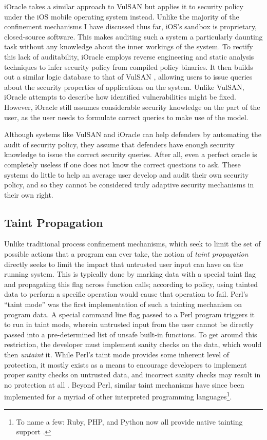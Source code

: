 \documentclass[dvipsnames, 12pt]{article}
\begin{document}
iOracle \cite{deshotels18_ioracle} takes a similar approach to VulSAN but
applies it to security policy under the iOS mobile operating system instead.
Unlike the majority of the confinement mechanisms I have discussed thus far,
iOS's sandbox is proprietary, closed-source software. This makes auditing such
a system a particularly daunting task without any knowledge about the inner
workings of the system. To rectify this lack of auditability, iOracle employs
reverse engineering and static analysis techniques to infer security policy from
compiled policy binaries. It then builds out a similar logic database to that of
VulSAN \cite{chen09_vulsan}, allowing users to issue queries about the security
properties of applications on the system. Unlike VulSAN, iOracle attempts to
describe how identified vulnerabilities might be fixed. However, iOracle still
assumes considerable security knowledge on the part of the user, as the user
needs to formulate correct queries to make use of the model.

Although systems like VulSAN and iOracle can help defenders by automating the
audit of security policy, they assume that defenders have enough security
knowledge to issue the correct security queries. After all, even a perfect
oracle is completely useless if one does not know the correct questions to ask.
These systems do little to help an average user develop and audit their own
security policy, and so they cannot be considered truly adaptive security
mechanisms in their own right.

\subsection{Taint Propagation}

Unlike traditional process confinement mechanisms, which seek to limit the set
of possible actions that a program can ever take, the notion of \textit{taint
propagation} directly seeks to limit the impact that untrusted user input can
have on the running system. This is typically done by marking data with
a special taint flag and propagating this flag across function calls; according
to policy, using tainted data to perform a specific operation would cause that
operation to fail.  Perl's \enquote{taint mode} \cite{hurst2004_perl} was the
first implementation of such a tainting mechanism on program data. A special
command line flag passed to a Perl program triggers it to run in taint mode,
wherein untrusted input from the user cannot be directly passed into
a pre-determined list of unsafe built-in functions. To get around this
restriction, the developer must implement sanity checks on the data, which would
then \textit{untaint} it. While Perl's taint mode provides some inherent level
of protection, it mostly exists as a means to encourage developers to implement
proper sanity checks on untrusted data, and incorrect sanity checks may result
in no protection at all \cite{hurst2004_perl}. Beyond Perl, similar taint
mechanisms have since been implemented for a myriad of other interpreted
programming languages\footnote{To name a few: Ruby, PHP, and Python now all
provide native tainting support \cite{conti2010_taint}.}.
\end{document}
